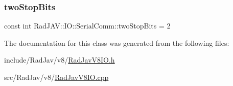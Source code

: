 \subsubsection{\texorpdfstring{two\+Stop\+Bits}{twoStopBits}}
{\footnotesize\ttfamily const int Rad\+J\+A\+V\+::\+I\+O\+::\+Serial\+Comm\+::two\+Stop\+Bits = 2\hspace{0.3cm}{\ttfamily [static]}}



The documentation for this class was generated from the following files\+:\begin{DoxyCompactItemize}
\item 
include/\+Rad\+Jav/v8/\mbox{\hyperlink{_rad_jav_v8_i_o_8h}{Rad\+Jav\+V8\+I\+O.\+h}}\item 
src/\+Rad\+Jav/v8/\mbox{\hyperlink{_rad_jav_v8_i_o_8cpp}{Rad\+Jav\+V8\+I\+O.\+cpp}}\end{DoxyCompactItemize}
